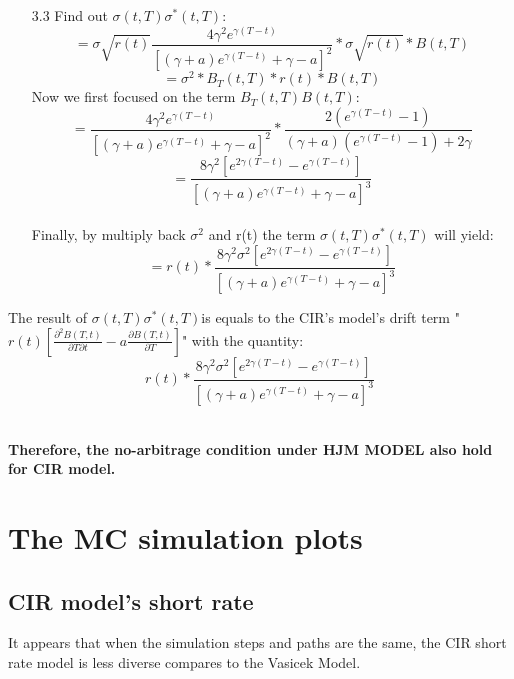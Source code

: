 \documentclass[14pt]{extarticle}
\begin{document}
\begin{itemize}
\begin{itemize}
\begin{itemize}
        \item[3.3] Find out $\sigma(t,T)\sigma^*(t,T)$:
        $$=\sigma \sqrt{r(t)}\frac{4\gamma^2e^{\gamma(T-t)}}{[(\gamma+a)e^{\gamma(T-t)}+\gamma-a ]^2}*\sigma \sqrt{r(t)}*B(t,T)    $$
        $$=\sigma^2*B_T(t,T)*r(t)*B(t,T)$$
        Now we first focused on the term $B_T(t,T)B(t,T)$:
        $$= \frac{4\gamma^2e^{\gamma(T-t)}}{[(\gamma+a)e^{\gamma(T-t)}+\gamma-a ]^2}* \frac{ 2(e^{\gamma(T-t)}-1)    } { (\gamma+a)(e^{\gamma(T-t)}-1 ) +2\gamma  }  $$
        $$=\frac{8\gamma^2[e^{2\gamma(T-t)}-e^{\gamma(T-t)}]} {[(\gamma+a)e^{\gamma(T-t)}+\gamma-a ]^3}         $$
        ~\\
        Finally, by multiply back $\sigma^2$ and r(t) the term $\sigma(t,T)\sigma^*(t,T) $ will yield:
        $$ =r(t)*\frac{8\gamma^2\sigma^2[e^{2\gamma(T-t)}-e^{\gamma(T-t)}]     } {[(\gamma+a)e^{\gamma(T-t)}+\gamma-a ]^3}$$
        
    \end{itemize}
\newpage
    The result of $\sigma(t,T)\sigma^*(t,T) $is equals to the CIR's model's drift term "$r(t)[\frac{ \partial^2 B(T,t) }{ \partial T \partial t} -a \frac{ \partial B(T,t) }{ \partial T}]$" with the quantity:
    $$ r(t)*\frac{8\gamma^2\sigma^2[e^{2\gamma(T-t)}-e^{\gamma(T-t)}]     } {[(\gamma+a)e^{\gamma(T-t)}+\gamma-a ]^3}$$
    ~\\
   
    
    \end{itemize}
    \textbf{Therefore, the no-arbitrage condition under HJM MODEL also hold for CIR model.}
    
\end{itemize}














\newpage
\section{The MC simulation plots}
\subsection{CIR model's short rate }
\begin{figure}[htbp]
\centering

\end{figure}
It appears that when the simulation steps and paths are the same, the CIR short rate model is less diverse compares to the Vasicek Model.
\newpage
\end{document}
